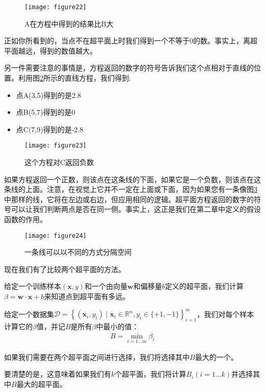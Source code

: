 \begin{figure}[ht]
	\centering
	\texttt{[image: figure22]}
	\caption{A在方程中得到的结果比B大}
	\label{figure22}
\end{figure}

正如你所看到的，当点不在超平面上时我们得到一个不等于0的数。事实上，离超平面越远，得到的数值越大。

另一件需要注意的事情是，方程返回的数字的符号告诉我们这个点相对于直线的位置。利用图\ref{figure23}所示的直线方程，我们得到:
\begin{itemize}
    \item 点A(3,5)得到的是2.8
    \item 点B(5,7)得到的是0
    \item 点C(7,9)得到的是-2.8
\end{itemize}


\begin{figure}[ht]
	\centering
	\texttt{[image: figure23]}
	\caption{这个方程对C返回负数}
	\label{figure23}
\end{figure}

如果方程返回一个正数，则该点在这条线的下面，如果它是一个负数，则该点在这条线的上面。注意，在视觉上它并不一定在上面或下面，因为如果您有一条像图\ref{figure24}中那样的线，它将在左边或右边，但应用相同的逻辑。超平面方程返回的数字的符号可以让我们判断两点是否在同一侧。事实上，这正是我们在第二章中定义的假设函数的作用。



\begin{figure}[ht]
	\centering
	\texttt{[image: figure24]}
	\caption{一条线可以以不同的方式分隔空间}
	\label{figure24}
\end{figure}

现在我们有了比较两个超平面的方法。


给定一个训练样本$(\mathbf{x},y)$和一个由向量$\mathbf{w}$和偏移量$b$定义的超平面，我们计算$\beta=\mathbf{w}\cdot\mathbf{x}+b$来知道点到超平面有多远。

给定一个数据集$\mathcal{D}=\left\{(\mathbf{x}_i,y_i)\mid \mathbf{x}_i \in \mathbb{R}^n,y_i \in \{+1,-1\}  \right\}_{i=1}^m$，我们对每个样本计算它的$\beta$值，并记$B$是所有$\beta$中最小的值：
\begin{gather*}
B = \min_{i=1\dots m}\beta_i
\end{gather*}

如果我们需要在两个超平面之间进行选择，我们将选择其中$B$最大的一个。

要清楚的是，这意味着如果我们有$k$个超平面，我们将计算$B_i (i=1\dots k)$并选择其中$B$最大的超平面。


